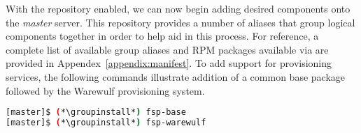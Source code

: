With the \FSP{} repository enabled, we can now begin adding desired components onto the
{\em master} server. This repository provides a number of aliases that group
logical components together in order to help aid in this process. For
reference, a complete list of available group aliases and RPM packages available
via \FSP{} are provided in Appendex~\ref{appendix:manifest}.  To add
support for provisioning services, the following commands illustrate addition
of a common base package followed by the Warewulf provisioning system.

\begin{lstlisting}[language=bash,keywords={}]
[master]$ (*\groupinstall*) fsp-base
[master]$ (*\groupinstall*) fsp-warewulf
\end{lstlisting}

